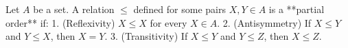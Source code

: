 Let $A$ be a set. A relation $\leq$ defined for some pairs $X, Y \in A$ is a **partial order** if:
1. (Reflexivity) $X \leq X$ for every $X \in A$.
2. (Antisymmetry) If $X \leq Y$ and $Y \leq X$, then $X = Y$.
3. (Transitivity) If $X \leq Y$ and $Y \leq Z$, then $X \leq Z$.
